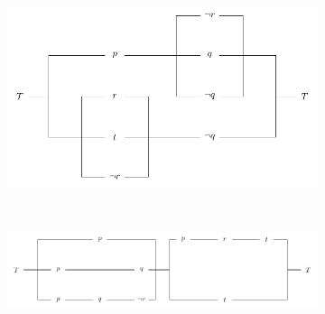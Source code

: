 \documentclass[a4paper, english, 12pt]{article} %
\begin{document}
\begin{figure}[hbp!]
  \centering
  \begin{subfigure}[b]{0.45\textwidth}
    \includegraphics[width=\textwidth]{MA0301-oving-02-truth-diagram-1}
    \caption{}
    \label{fig:truth-diagram-1}
  \end{subfigure}
  ~ %
  \begin{subfigure}[b]{0.5\textwidth}
    \includegraphics[width=\textwidth]{MA0301-oving-02-truth-diagram-2}
    \caption{}
    \label{fig:truth-diagram-2}
  \end{subfigure}
  \caption{}\label{fig:diagrams}
\end{figure}
\end{document}
